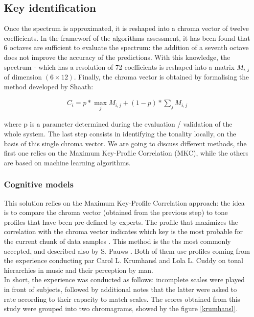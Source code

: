 \documentclass[letterpaper]{article}
\begin{document}
\subsection{Key identification}

Once the spectrum is approximated, it is reshaped into a chroma vector of twelve coefficients. In the frameworf of the algorithms assessment, it has been found that 6 octaves are sufficient to evaluate the spectrum: the addition of a seventh octave does not improve the accuracy of the predictions. With this knowledge, the spectrum - which has a resolution of 72 coefficients is reshaped into a matrix $M_{i, j}$ of dimension $(6 \times 12)$. Finally, the chroma vector is obtained by formalising the method developed by Sha\textquotesingle ath:

\begin{align}
C_{i} = p * \max_{j} M_{i, j} + (1 - p) * \sum_{j} M_{i, j}
\label{chroma}
\end{align}

where p is a parameter determined during the evaluation / validation of the whole system.
The last step consists in identifying the tonality locally,
on the basis of this single chroma vector. We are going to discuss different methods, the first one relies on the Maximum Key-Profile Correlation (MKC),
while the others are based on machine learning algorithms.

\subsubsection{Cognitive models}

This solution relies on the Maximum Key-Profile Correlation approach: the idea is to compare the chroma vector (obtained from the previous step) to
tone profiles that have been pre-defined by experts. The profile that maximizes the correlation with the chroma vector indicates which key is the most probable
for the current chunk of data samples \citep{AT}. This method is the ths most commonly accepted, and described also by S. Pauws \citep{SP}. Both of them use profiles coming from the experience conducting par Carol L. Krumhansl and Lola L. Cuddy on tonal hierarchies in music and their perception by man.\\

In short, the experience was conducted as follows: incomplete scales were played in front of subjects, followed by additional notes that the latter were asked to rate according to their capacity to match scales. The scores obtained from this study were grouped into two chromagrams, showed by the figure \ref{krumhansl}. \\
\end{document}
